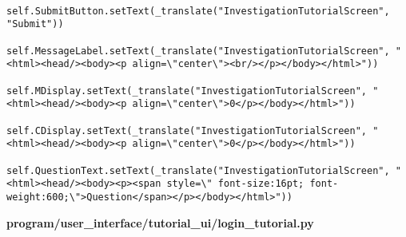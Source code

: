 \documentclass{article}
\begin{document}
\begin{lstlisting}
        self.SubmitButton.setText(_translate("InvestigationTutorialScreen", "Submit"))
        self.MessageLabel.setText(_translate("InvestigationTutorialScreen", "<html><head/><body><p align=\"center\"><br/></p></body></html>"))
        self.MDisplay.setText(_translate("InvestigationTutorialScreen", "<html><head/><body><p align=\"center\">0</p></body></html>"))
        self.CDisplay.setText(_translate("InvestigationTutorialScreen", "<html><head/><body><p align=\"center\">0</p></body></html>"))
        self.QuestionText.setText(_translate("InvestigationTutorialScreen", "<html><head/><body><p><span style=\" font-size:16pt; font-weight:600;\">Question</span></p></body></html>"))
\end{lstlisting}


\textbf{program/user\_interface/tutorial\_ui/login_tutorial.py}
\end{document}
